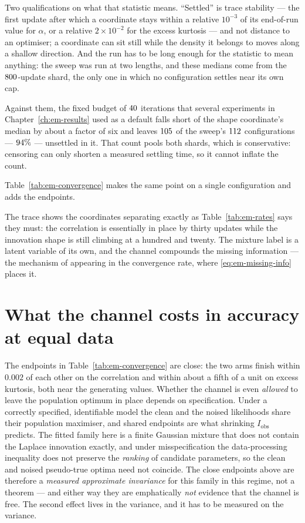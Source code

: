 Two qualifications on what that statistic means. ``Settled'' is trace
stability --- the first update after which a coordinate stays within a
relative $10^{-3}$ of its end-of-run value for $\alpha$, or a relative
$2\times10^{-2}$ for the excess kurtosis --- and not distance to an
optimiser; a coordinate can sit
still while the density it belongs to moves along a shallow direction. And the
run has to be long enough for the statistic to mean anything: the sweep was run
at two lengths, and these medians come from the $800$-update shard, the
only one in which no configuration settles near its own cap.

Against them, the fixed budget of $40$ iterations that several
experiments in Chapter~\ref{ch:em-results} used as a default falls short of the
shape coordinate's median by about a factor of six and leaves
$105$ of the sweep's $112$ configurations
--- $94\%$ --- unsettled in it. That count pools both shards,
which is conservative: censoring can only shorten a measured settling time, so
it cannot inflate the count.

Table~\ref{tab:em-convergence} makes the same point on a single configuration
and adds the endpoints.



\noindent The trace shows the coordinates separating exactly as
Table~\ref{tab:em-rates} says they must: the correlation is essentially in
place by thirty updates while the innovation shape is still climbing at a
hundred and twenty. The mixture label is a latent variable of its own, and the
channel compounds the missing information --- the mechanism of
\citet{dempster1977maximum} appearing in the convergence rate, where
\eqref{eq:em-missing-info} places it.

\section{What the channel costs in accuracy at equal data}
\label{sec:em-information}

The endpoints in Table~\ref{tab:em-convergence} are close: the two arms finish
within $0.002$ of each other on the correlation and within about a fifth of a
unit on excess kurtosis, both near the generating values. Whether the channel
is even \emph{allowed} to leave the population optimum in place depends on
specification. Under a correctly specified, identifiable model the clean and
the noised likelihoods share their population maximiser, and shared endpoints
are what shrinking $I_{\mathrm{obs}}$ predicts. The fitted family here is a
finite Gaussian mixture that does not contain the Laplace innovation exactly,
and under misspecification the data-processing inequality does not preserve
the \emph{ranking} of candidate parameters, so the clean and noised
pseudo-true optima need not coincide. The close endpoints above are therefore
a \emph{measured approximate invariance} for this family in this regime, not
a theorem --- and either way they are emphatically \emph{not} evidence that
the channel is free. The second effect
lives in the variance, and it has to be measured on the variance.

